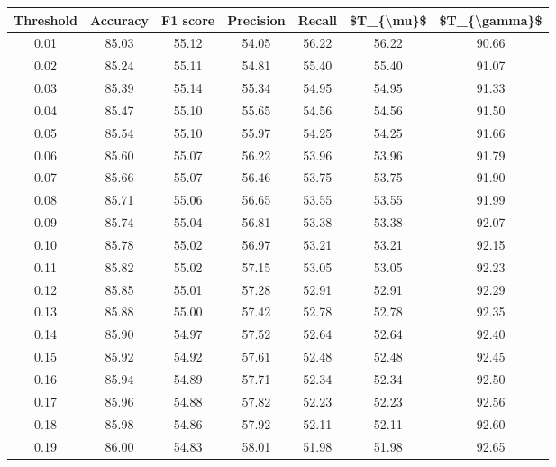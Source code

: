 \begin{tabular}{|c|c|c|c|c|c|c|}
\hline
 Threshold &  Accuracy &  F1 score &  Precision &  Recall &  \$T\_\{\textbackslash mu\}\$ &  \$T\_\{\textbackslash gamma\}\$ \\
\hline
      0.01 &     85.03 &     55.12 &      54.05 &   56.22 &      56.22 &         90.66 \\
      0.02 &     85.24 &     55.11 &      54.81 &   55.40 &      55.40 &         91.07 \\
      0.03 &     85.39 &     55.14 &      55.34 &   54.95 &      54.95 &         91.33 \\
      0.04 &     85.47 &     55.10 &      55.65 &   54.56 &      54.56 &         91.50 \\
      0.05 &     85.54 &     55.10 &      55.97 &   54.25 &      54.25 &         91.66 \\
      0.06 &     85.60 &     55.07 &      56.22 &   53.96 &      53.96 &         91.79 \\
      0.07 &     85.66 &     55.07 &      56.46 &   53.75 &      53.75 &         91.90 \\
      0.08 &     85.71 &     55.06 &      56.65 &   53.55 &      53.55 &         91.99 \\
      0.09 &     85.74 &     55.04 &      56.81 &   53.38 &      53.38 &         92.07 \\
      0.10 &     85.78 &     55.02 &      56.97 &   53.21 &      53.21 &         92.15 \\
      0.11 &     85.82 &     55.02 &      57.15 &   53.05 &      53.05 &         92.23 \\
      0.12 &     85.85 &     55.01 &      57.28 &   52.91 &      52.91 &         92.29 \\
      0.13 &     85.88 &     55.00 &      57.42 &   52.78 &      52.78 &         92.35 \\
      0.14 &     85.90 &     54.97 &      57.52 &   52.64 &      52.64 &         92.40 \\
      0.15 &     85.92 &     54.92 &      57.61 &   52.48 &      52.48 &         92.45 \\
      0.16 &     85.94 &     54.89 &      57.71 &   52.34 &      52.34 &         92.50 \\
      0.17 &     85.96 &     54.88 &      57.82 &   52.23 &      52.23 &         92.56 \\
      0.18 &     85.98 &     54.86 &      57.92 &   52.11 &      52.11 &         92.60 \\
      0.19 &     86.00 &     54.83 &      58.01 &   51.98 &      51.98 &         92.65 \\

\end{tabular}
